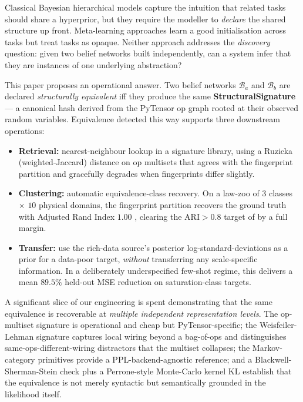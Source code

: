 \documentclass{article}
\begin{document}
Classical Bayesian hierarchical models capture the intuition that
related tasks should share a hyperprior, but they require the
modeller to \emph{declare} the shared structure up front. Meta-learning
approaches \citep{finn2017maml} learn a good initialisation across
tasks but treat tasks as opaque. Neither approach addresses the
\emph{discovery} question: given two belief networks built independently,
can a system infer that they are instances of one underlying
abstraction?

This paper proposes an operational answer. Two belief networks
$\mathcal{B}_{a}$ and $\mathcal{B}_{b}$ are declared
\emph{structurally equivalent} iff they produce the same
\textbf{StructuralSignature} --- a canonical hash derived from the
PyTensor op graph rooted at their observed random variables. Equivalence
detected this way supports three downstream operations:

\begin{itemize}[leftmargin=*, itemsep=0pt]
\item \textbf{Retrieval:} nearest-neighbour lookup in a signature
  library, using a Ruzicka (weighted-Jaccard) distance on op multisets
  that agrees with the fingerprint partition and gracefully degrades
  when fingerprints differ slightly.
\item \textbf{Clustering:} automatic equivalence-class recovery.
  On a law-zoo of $3$ classes $\times$ $10$ physical domains, the
  fingerprint partition recovers the ground truth with Adjusted Rand
  Index $1.00$ \citep{hubert1985ari}, clearing the
  $\text{ARI} > 0.8$ target of \citet[Phase 5]{anonymousMEISplan} by a
  full margin.
\item \textbf{Transfer:} use the rich-data source's posterior
  log-standard-deviations as a prior for a data-poor target, \emph{without}
  transferring any scale-specific information. In a deliberately
  underspecified few-shot regime, this delivers a mean $89.5\%$
  held-out MSE reduction on saturation-class targets.
\end{itemize}

A significant slice of our engineering is spent demonstrating that the
same equivalence is recoverable at \emph{multiple independent
representation levels}. The op-multiset signature is operational and
cheap but PyTensor-specific; the Weisfeiler-Lehman signature
\citep{shervashidze2011wl} captures local wiring beyond a bag-of-ops
and distinguishes same-ops-different-wiring distractors that the
multiset collapses; the Markov-category primitives
\citep{fritz2020synthetic, perrone2024catinfogeom} provide a
PPL-backend-agnostic reference; and a Blackwell-Sherman-Stein check
\citep{blackwell1953equivalent} plus a Perrone-style Monte-Carlo
kernel KL establish that the equivalence is not merely syntactic but
semantically grounded in the likelihood itself.
\end{document}
